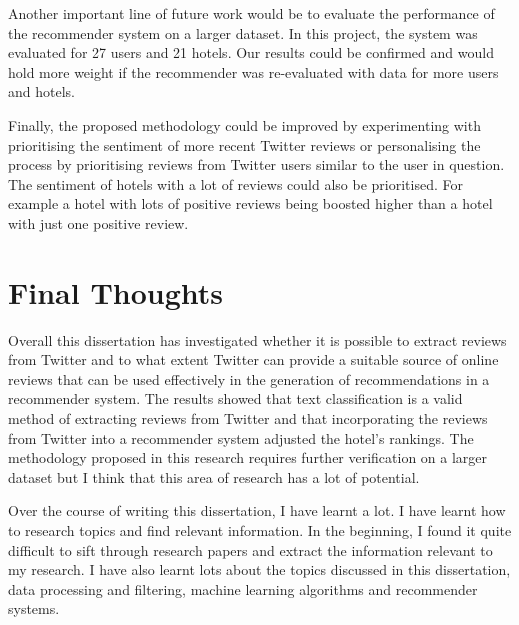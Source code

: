 Another important line of future work would be to evaluate the performance of the recommender system on a larger dataset. In this project, the system was evaluated for 27 users and 21 hotels. Our results could be confirmed and would hold more weight if the recommender was re-evaluated with data for more users and hotels.

Finally, the proposed methodology could be improved by experimenting with prioritising the sentiment of more recent Twitter reviews or personalising the process by prioritising reviews from Twitter users similar to the user in question. The sentiment of hotels with a lot of reviews could also be prioritised. For example a hotel with lots of positive reviews being boosted higher than a hotel with just one positive review.

\section{Final Thoughts}

Overall this dissertation has investigated whether it is possible to extract reviews from Twitter and to what extent Twitter can provide a suitable source of online reviews that can be used effectively in the generation of recommendations in a recommender system. The results showed that text classification is a valid method of extracting reviews from Twitter and that incorporating the reviews from Twitter into a recommender system adjusted the hotel's rankings. The methodology proposed in this research requires further verification on a larger dataset but I think that this area of research has a lot of potential. 

Over the course of writing this dissertation, I have learnt a lot. I have learnt how to research topics and find relevant information. In the beginning, I found it quite difficult to sift through research papers and extract the information relevant to my research. I have also learnt lots about the topics discussed in this dissertation, data processing and filtering, machine learning algorithms and recommender systems.